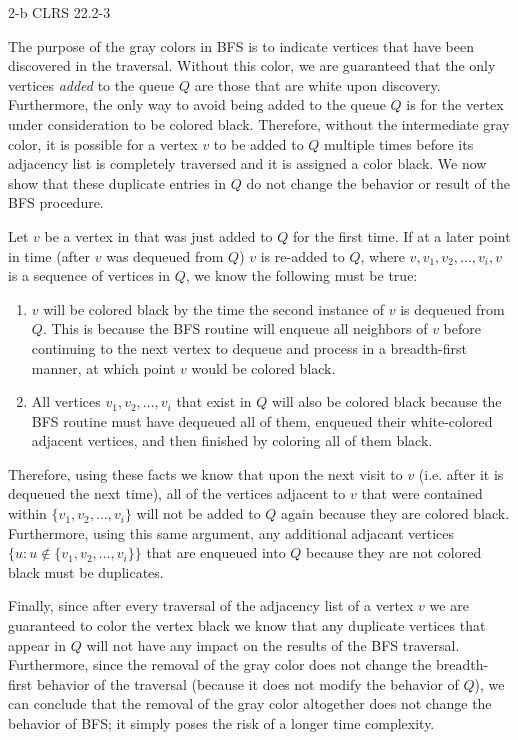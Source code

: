 \documentclass[11pt]{article}
\begin{document}
\begin{prob}{2-b}
CLRS 22.2-3 
\end{prob}
\begin{sol} 

The purpose of the gray colors in BFS is to indicate vertices that have been discovered in the traversal. Without this color, we are guaranteed that the only vertices \emph{added} to the queue $Q$ are those that are white upon discovery. Furthermore, the only way to avoid being added to the queue $Q$ is for the vertex under consideration to be colored black. Therefore, without the intermediate gray color, it is possible for a vertex $v$ to be added to $Q$ multiple times before its adjacency list is completely traversed and it is assigned a color black. We now show that these duplicate entries in $Q$ do not change the behavior or result of the BFS procedure.

Let $v$ be a vertex in that was just added to $Q$ for the first time. If at a later point in time (after $v$ was dequeued from $Q$) $v$ is re-added to $Q$, where $v, v_{1}, v_{2}, ..., v_{i}, v$ is a sequence of vertices in $Q$, we know the following must be true: 

\begin{enumerate}
	\item $v$ will be colored black by the time the second instance of $v$ is dequeued from $Q$. This is because the BFS routine will enqueue all neighbors of $v$ before continuing to the next vertex to dequeue and process in a breadth-first manner, at which point $v$ would be colored black.
	\item All vertices $v_{1}, v_{2},...,v_{i}$ that exist in $Q$ will also be colored black because the BFS routine must have dequeued all of them, enqueued their white-colored adjacent vertices, and then finished by coloring all of them black.
\end{enumerate}

Therefore, using these facts we know that upon the next visit to $v$ (i.e. after it is dequeued the next time), all of the vertices adjacent to $v$ that were contained within $\{v_{1}, v_{2},...,v_{i}\}$ will not be added to $Q$ again because they are colored black. Furthermore, using this same argument, any additional adjacant vertices $\{u : u \notin \{v_{1}, v_{2}, ..., v_{i}\}\}$ that are enqueued into $Q$ because they are not colored black must be duplicates. 

Finally, since after every traversal of the adjacency list of a vertex $v$ we are guaranteed to color the vertex black we know that any duplicate vertices that appear in $Q$ will not have any impact on the results of the BFS traversal. Furthermore, since the removal of the gray color does not change the breadth-first behavior of the traversal (because it does not modify the behavior of $Q$), we can conclude that the removal of the gray color altogether does not change the behavior of BFS; it simply poses the risk of a longer time complexity.

\end{sol}
\end{document}
